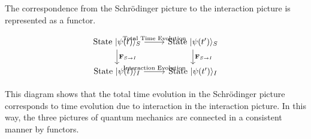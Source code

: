 \documentclass[uplatex,a4j,12pt,dvipdfmx]{jsarticle}
\begin{document}
The correspondence from the Schrödinger picture to the interaction picture is represented as a functor.

$$
	\begin{tikzcd}
		\text{State } |\psi(t)\rangle_S \arrow[r, "\text{Total Time Evolution}"] \arrow[d, "\mathbf{F}_{S \to I}"] & \text{State } |\psi(t')\rangle_S \arrow[d, "\mathbf{F}_{S \to I}"] \\
		\text{State } |\psi(t)\rangle_I \arrow[r, "\text{Interaction Evolution}"] & \text{State } |\psi(t')\rangle_I
	\end{tikzcd}
$$

This diagram shows that the total time evolution in the Schrödinger picture corresponds to time evolution due to interaction in the interaction picture. In this way, the three pictures of quantum mechanics are connected in a consistent manner by functors.
\end{document}
